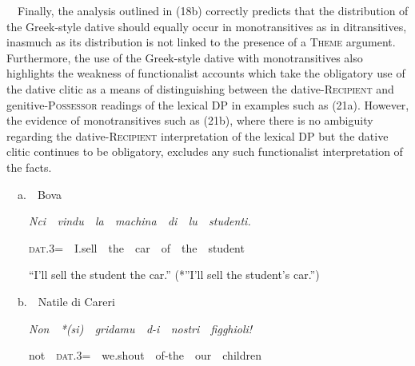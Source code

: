 \documentclass[output=paper,modfonts,nonflat]{langsci/langscibook}
\begin{document}
\begin{styleStandard}
\ \ Finally, the analysis outlined in (18b) correctly predicts that the distribution of the Greek-style dative should equally occur in monotransitives as in ditransitives, inasmuch as its distribution is not linked to the presence of a \textsc{Theme} argument. Furthermore, the use of the Greek-style dative with monotransitives also highlights the weakness of functionalist accounts which take the obligatory use of the dative clitic as a means of distinguishing between the dative-\textsc{Recipient} and genitive-\textsc{Possessor} readings of the lexical DP in examples such as (21a). However, the evidence of monotransitives such as (21b), where there is no ambiguity regarding the dative-\textsc{Recipient} interpretation of the lexical DP but the dative clitic continues to be obligatory, excludes any such functionalist interpretation of the facts.
\end{styleStandard}

\begin{listWWNumviiileveli}
\item 
\begin{styleListParagraph}
\ \ a.\ \ Bova
\end{styleListParagraph}
\end{listWWNumviiileveli}
\begin{styleListParagraph}
\ \ \ \ \textit{Nci\ \ vindu\ \ la\ \ machina\ \ di\ \ lu\ \ studenti.}
\end{styleListParagraph}

\begin{styleStandard}
\ \ \ \ \textsc{dat}.3=\ \ I.sell\ \ the\ \ car\ \ of\ \ the\ \ student
\end{styleStandard}

\begin{styleStandard}
\ \ \ \ “I’ll sell the student the car.” (*”I’ll sell the student’s car.”)
\end{styleStandard}

\begin{styleStandard}
\ \ b.\ \ Natile di Careri
\end{styleStandard}

\begin{styleStandard}
\ \ \ \ \textit{Non\ \ *(si)\ \ gridamu\ \ d-i\ \ nostri\ \ figghioli!}
\end{styleStandard}

\begin{styleStandard}
\ \ \ \ not\ \ \textsc{dat}.3=\ \ we.shout\ \ of-the\ \ our\ \ children
\end{styleStandard}
\end{document}
